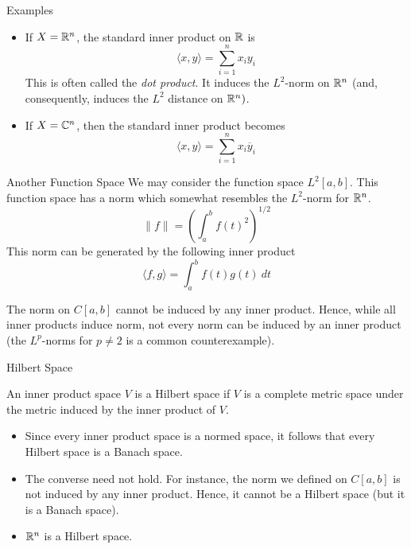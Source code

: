 \documentclass[10pt]{beamer}
\begin{document}
		\begin{frame}{Examples}
				\begin{itemize}
						\item<1-> If $X = \mathbb{R}^n$, the standard inner product on $\mathbb{R}$ is 
								\begin{equation*}
										\langle x, y \rangle = \sum_{i=1}^{n} x_iy_i
								\end{equation*}
								This is often called the \emph{dot product}. It induces the $L^2$-norm on $\mathbb{R}^n$ (and, consequently, induces the $L^2$ distance on $\mathbb{R}^n)$. 

						\item<2-> If $X = \mathbb{C}^n$, then the standard inner product becomes 
								\begin{equation*}
										\langle x, y \rangle = \sum_{i=1}^{n} x_i \overline{y}_i
								\end{equation*}
				\end{itemize}	
		\end{frame}

		\begin{frame}{Another Function Space}
				We may consider the function space $L^2[a,b]$. This function space has a norm which somewhat resembles the $L^2$-norm for $\mathbb{R}^n$. 
				\begin{equation*}
						\|f\| = \left( \int_a^b f(t)^2 \right)^{1/2}
				\end{equation*}
				This norm can be generated by the following inner product 
				\begin{equation*}
						\langle f, g \rangle = \int_a^b f(t)g(t)\ dt
				\end{equation*}

				\begin{block}{}
						The norm on $C[a,b]$ cannot be induced by any inner product. Hence, while all inner products induce norm, not every norm can be induced by an inner product (the $L^p$-norms for $p \neq 2$ is a common counterexample).
				\end{block}
		\end{frame}

		\begin{frame}{Hilbert Space}
				\begin{definition}
						An inner product space $V$ is a \alert{Hilbert space} if $V$ is a complete metric space under the metric induced by the inner product of $V$. 
				\end{definition}
				\begin{itemize}
						\item<2-> Since every inner product space is a normed space, it follows that every Hilbert space is a Banach space. 
						\item<3-> The converse need not hold. For instance, the norm we defined on $C[a,b]$ is not induced by any inner product. Hence, it cannot be a Hilbert space (but it is a Banach space).
						\item<4-> $\mathbb{R}^n$ is a Hilbert space. 
				\end{itemize}
		\end{frame}
\end{document}
